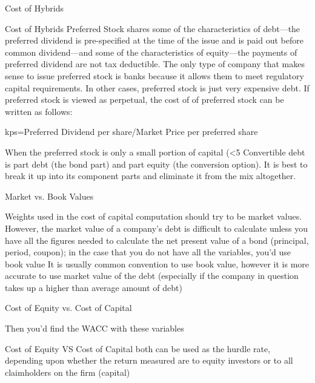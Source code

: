 \documentclass[10pt]{article}
\begin{document}
    \begin{core}{Cost of Hybrids}

      Cost of Hybrids
      Preferred Stock shares some of the characteristics of debt—the preferred dividend is pre-specified at the time of the issue and is paid out before common dividend—and some of the characteristics of equity—the payments of preferred dividend are not tax deductible. The only type of company that makes sense to issue preferred stock is banks because it allows them to meet regulatory capital requirements. In other cases, preferred stock is just very expensive debt. If preferred stock is viewed as perpetual, the cost of of preferred stock can be written as follows:

      kps=Preferred Dividend per share/Market Price per preferred share

      When the preferred stock is only a small portion of capital (<5%
      Convertible debt is part debt (the bond part) and part equity (the conversion option). It is best to break it up into its component parts and eliminate it from the mix altogether. 

    \end{core}

    \begin{core}{Market vs. Book Values}

      Weights used in the cost of capital computation should try to be market values.
      However, the market value of a company’s debt is difficult to calculate unless you have all the figures needed to calculate the net present value of a bond (principal, period, coupon); in the case that you do not have all the variables, you’d use book value
      It is usually common convention to use book value, however it is more accurate to use market value of the debt (especially if the company in question takes up a higher than average amount of debt)

    \end{core}

    \begin{core}{Cost of Equity vs. Cost of Capital}


      Then you’d find the WACC with these variables

      Cost of Equity VS Cost of Capital
      both can be used as the hurdle rate, depending upon whether the return measured are to equity investors or to all claimholders on the firm (capital)

    \end{core}
\end{document}
